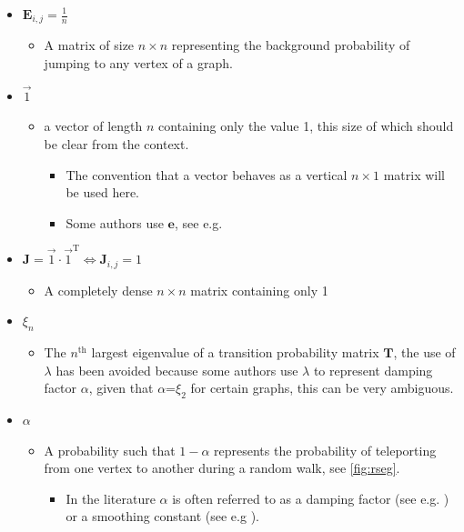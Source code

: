 \documentclass[11pt]{report}
\begin{document}
\begin{itemize}
\begin{itemize}
\begin{itemize}
\end{itemize}
\end{itemize}
\item \(\mathbf{E}_{i,j} = \frac{1}{n}\)
\begin{itemize}
\item A matrix of size \(n\times n\) representing the background probability of jumping to any vertex of a graph.
\end{itemize}
\item \(\vec{1}\)
\begin{itemize}
\item a vector of length \(n\) containing only the value 1, this size of which should be clear from the context.
\begin{itemize}
\item The convention that a vector behaves as a vertical \(n \times 1\) matrix will be used here.
\item Some authors use \(\mathbf{e}\), see e.g. \cite{langvilleGooglePageRankScience2012}
\end{itemize}
\end{itemize}
\item \(\mathbf{J} = \vec{1}\cdot \vec{1}^{\mathrm{T}} \iff \mathbf{J}_{i,j} = 1\)
\begin{itemize}
\item A completely dense \(n \times n\) matrix containing only 1
\end{itemize}
\item \(\xi_{n}\)
\begin{itemize}
\item The \(n^{\mathrm{th}}\) largest eigenvalue of a transition probability matrix \(\mathbf{T}\), the use of \(\lambda\) has been avoided because some authors use \(\lambda\) to represent damping factor \(\alpha\), given that \(\alpha\)=\(\xi_{2}\) for certain graphs, this can be very ambiguous.
\end{itemize}
\item \(\alpha\)
\begin{itemize}
\item A probability such that \(1-\alpha\) represents the probability of teleporting from one vertex to another during a random walk, see \ref{fig:rseg}.
\begin{itemize}
\item In the literature \(\alpha\) is often referred to as a damping factor (see e.g.  \cite{berkhoutRankingNodesGeneral2018a,brinkmeierPageRankRevisited2006a,fuDampingFactorGoogle2006,kamvarAdaptiveMethodsComputation2004b,bianchiniPageRank2005}) or a smoothing constant (see e.g \cite{koppelMeasuringDirectIndirect2014}).
\end{itemize}
\end{itemize}
\end{itemize}
\end{document}
